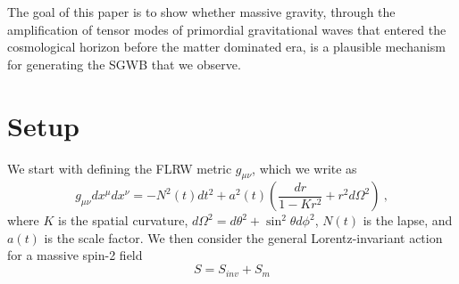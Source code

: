 \documentclass[prd,twocolumn,aps,psfig,nofootinbib,nobibnotes,superscriptaddress,preprintnumbers,times]{revtex4-2}
\begin{document}
The goal of this paper is to show whether massive gravity, through the amplification of tensor modes of primordial gravitational waves that entered the cosmological horizon before the matter dominated era, is a plausible mechanism for generating the SGWB that we observe. 

\section{Setup} 
We start with defining the FLRW metric $g_{\mu\nu}$, which we write as
\begin{equation}\label{eqn:-1}
    g_{\mu\nu}dx^{\mu} dx^{\nu} = -N^2(t)dt^2 +a^2(t)\left(\frac{dr}{1-Kr^2} + r^2 d\Omega^2\right)\ ,
\end{equation}
where $K$ is the spatial curvature, $d\Omega^2 = d\theta^2 + \sin^2\theta d\phi^2$, $N(t)$ is the lapse, and $a(t)$ is the scale factor. We then consider the general Lorentz-invariant action for a massive spin-2 field \cite{Blasi:2017}
\begin{equation}\label{eqn:0}
    S = S_{inv} + S_{m}
\end{equation}
\end{document}

